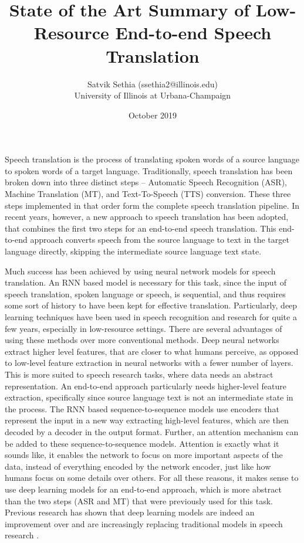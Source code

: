 \documentclass{article}
\title{State of the Art Summary of Low-Resource End-to-end Speech Translation}
\author{Satvik Sethia (ssethia2@illinois.edu)\\ University of Illinois at Urbana-Champaign}
\date{October 2019}
\begin{document}
\maketitle


Speech translation is the process of translating spoken words of a source language to spoken words of a target language. Traditionally, speech translation has been broken down into three distinct steps – Automatic Speech Recognition (ASR), Machine Translation (MT), and Text-To-Speech (TTS) conversion. These three steps implemented in that order form the complete speech translation pipeline. In recent years, however, a new approach to speech translation has been adopted, that combines the first two steps for an end-to-end speech translation. This end-to-end approach converts speech from the source language to text in the target language directly, skipping the intermediate source language text state. \medskip

Much success has been achieved by using neural network models for speech translation. An RNN based model is necessary for this task, since the input of speech translation, spoken language or speech, is sequential, and thus requires some sort of history to have been kept for effective translation. Particularly, deep learning techniques have been used in speech recognition and research for quite a few years, especially in low-resource settings. There are several advantages of using these methods over more conventional methods. Deep neural networks extract higher level features, that are closer to what humans perceive, as opposed to low-level feature extraction in neural networks with a fewer number of layers. This is more suited to speech research tasks, where data needs an abstract representation. An end-to-end approach particularly needs higher-level feature extraction, specifically since source language text is not an intermediate state in the process. The RNN based sequence-to-sequence models use encoders that represent the input in a new way extracting high-level features, which are then decoded by a decoder in the output format. Further, an attention mechanism can be added to these sequence-to-sequence models. Attention is exactly what it sounds like, it enables the network to focus on more important aspects of the data, instead of everything encoded by the network encoder, just like how humans focus on some details over others. For all these reasons, it makes sense to use deep learning models for an end-to-end approach, which is more abstract than the two steps (ASR and MT) that were previously used for this task. Previous research has shown that deep learning models are indeed an improvement over and are increasingly replacing traditional models in speech research \cite{Deng:13, Miao:13}. \medskip
\end{document}
